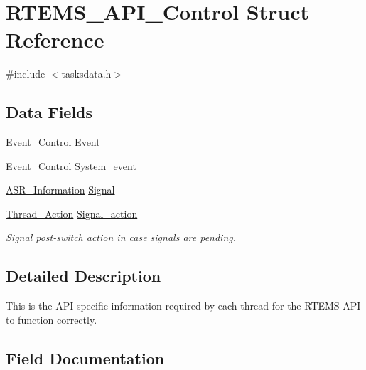 \hypertarget{structRTEMS__API__Control}{}\section{R\+T\+E\+M\+S\+\_\+\+A\+P\+I\+\_\+\+Control Struct Reference}
\label{structRTEMS__API__Control}


{\ttfamily \#include $<$tasksdata.\+h$>$}

\subsection*{Data Fields}
\begin{DoxyCompactItemize}
\item 
\mbox{\hyperlink{structEvent__Control}{Event\+\_\+\+Control}} \mbox{\hyperlink{structRTEMS__API__Control_ab0eb4025778fe7612cfb5997c72096cd}{Event}}
\item 
\mbox{\hyperlink{structEvent__Control}{Event\+\_\+\+Control}} \mbox{\hyperlink{structRTEMS__API__Control_aef8716dcde100d9dcd33265c54574c8c}{System\+\_\+event}}
\item 
\mbox{\hyperlink{structASR__Information}{A\+S\+R\+\_\+\+Information}} \mbox{\hyperlink{structRTEMS__API__Control_ad6d6751bc70d36ca5f6e99b1d5a55cef}{Signal}}
\item 
\mbox{\label{structRTEMS__API__Control_a32bd6642707fd973d8d5047cc2feb608}} 
\mbox{\hyperlink{structThread__Action}{Thread\+\_\+\+Action}} \mbox{\hyperlink{structRTEMS__API__Control_a32bd6642707fd973d8d5047cc2feb608}{Signal\+\_\+action}}
\begin{DoxyCompactList}\small\item\em Signal post-\/switch action in case signals are pending. \end{DoxyCompactList}\end{DoxyCompactItemize}


\subsection{Detailed Description}
This is the A\+PI specific information required by each thread for the R\+T\+E\+MS A\+PI to function correctly. 

\subsection{Field Documentation}
\mbox{\label{structRTEMS__API__Control_ab0eb4025778fe7612cfb5997c72096cd}} 
